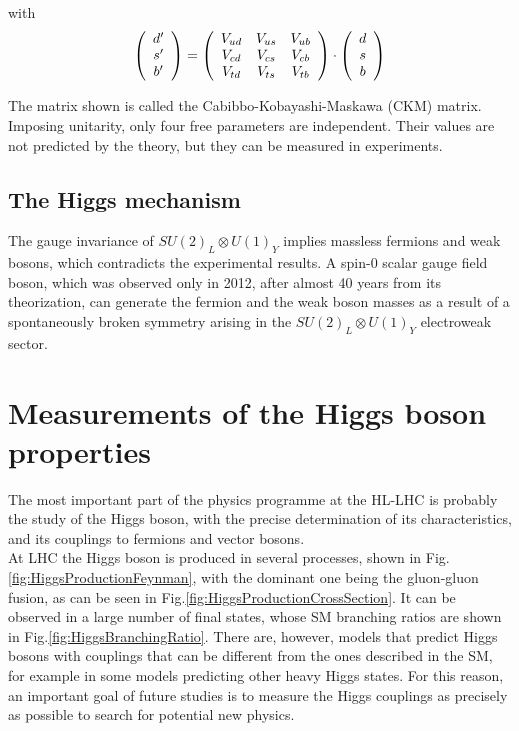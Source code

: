 \documentclass[a4paper,twoside,12pt]{book}
\begin{document}
with
\begin{equation*}
\centering
%
 \left( \begin{array}{c}
d'  \\
s' \\
b' \\
\end{array} \right) = 
%
 \left( \begin{array}{c c c}
V_{ud} & V_{us} & V_{ub}  \\
V_{cd} & V_{cs} & V_{cb}  \\
V_{td} & V_{ts} & V_{tb}  \\
\end{array} \right) \cdot
%
 \left( \begin{array}{c}
d  \\
s \\
b \\
\end{array} \right)
%
\end{equation*}

The matrix shown is called the Cabibbo-Kobayashi-Maskawa (CKM) matrix. Imposing
unitarity, only four free parameters are independent. Their values
are not predicted by the theory, but they can be measured in experiments. 

\subsection*{The Higgs mechanism}
The gauge invariance of $SU (2)_{L} \otimes U (1)_{Y}$ implies massless fermions and weak
bosons, which contradicts the experimental results. A spin-0 scalar gauge field boson, which
was observed only in 2012, after almost 40 years from its theorization\cite{TheoreticalHiggs},
 can generate the fermion and the weak boson masses as a result of a spontaneously
 broken symmetry arising in the $SU (2)_{L} \otimes U (1)_{Y}$ electroweak sector.

\section{Measurements of the Higgs boson properties}
The most important part of the physics programme at the HL-LHC is probably the study of the Higgs boson, with the precise determination of its characteristics, 
and its couplings to fermions and vector bosons\cite{loi}. \\

At LHC the Higgs boson is produced in several processes, shown in \mbox{Fig.\ref{fig:HiggsProductionFeynman}}, with
the dominant one being the gluon-gluon fusion, as can be seen in \mbox{Fig.\ref{fig:HiggsProductionCrossSection}}. It can be observed
in a large number of final states, whose SM branching ratios are shown in \mbox{Fig.\ref{fig:HiggsBranchingRatio}}. There are, however, models that
predict Higgs bosons with couplings that can be different from the ones described in the
SM, for example in some models predicting other heavy Higgs states. For this reason, an important goal of future studies is
to measure the Higgs couplings as precisely as possible to search for potential new physics. \\
\end{document}
